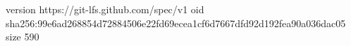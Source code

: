 version https://git-lfs.github.com/spec/v1
oid sha256:99e6ad268854d72884506e22fd69ecea1cf6d7667dfd92d192fea90a036dac05
size 590
